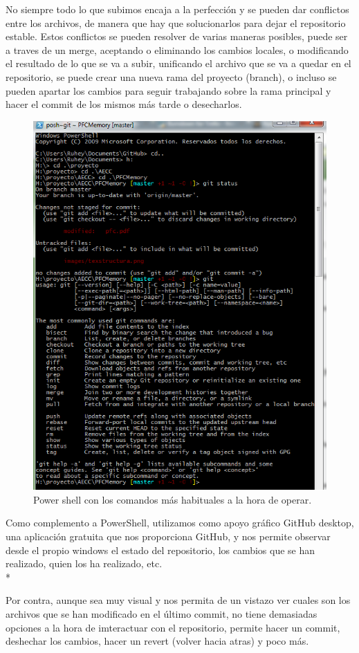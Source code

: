 \documentclass[../pfc.tex]{subfiles}
\begin{document}
	No siempre todo lo que subimos encaja a la perfección y se pueden dar conflictos entre los archivos, de manera que hay que solucionarlos para dejar el repositorio estable.
	Estos conflictos se  pueden resolver de varias maneras posibles, puede ser a traves de un merge, aceptando o eliminando los cambios locales, o modificando el resultado de lo que se va a subir, unificando el archivo que se va a quedar en el repositorio, se puede crear una nueva rama del proyecto (branch), o incluso se pueden apartar los cambios para seguir trabajando sobre la rama principal y hacer el commit de los mismos más tarde o desecharlos.
	
	\begin{figure}[H]
		\centering
		\includegraphics[width=0.7\linewidth]{../images/powerShell}
		\caption{Power shell con los comandos más habituales a la hora de operar.}
		\label{fig:powershell}
	\end{figure}
	
	Como complemento a PowerShell, utilizamos como apoyo gráfico GitHub desktop, una aplicación gratuita que nos proporciona GitHub, y nos permite observar desde el propio windows el estado del repositorio, los cambios que se han realizado, quien los ha realizado, etc.\\*
	
	Por contra, aunque sea muy visual y nos permita de un vistazo ver cuales son los archivos que se han modificado en el último commit, no tiene demasiadas opciones a la hora de imteractuar con el repositorio, permite hacer un commit, deshechar los cambios, hacer un revert (volver hacia atras) y poco más.
	
\end{document}
